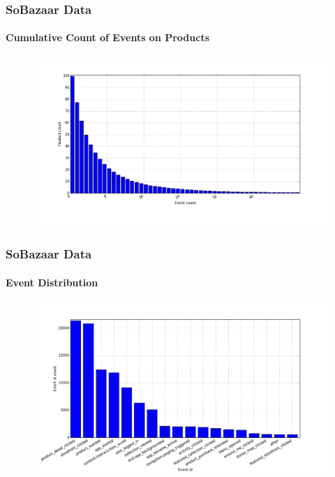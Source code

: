\documentclass{beamer}
\begin{document}
  \begin{frame}
    \frametitle{SoBazaar Data}
    \framesubtitle{Cumulative Count of Events on Products}
    \begin{figure}[H]
        \includegraphics[scale=0.3]{../src/image/product_idcumdistribution.png}
        \centering
    \end{figure}
  \end{frame}

  \begin{frame}
    \frametitle{SoBazaar Data}
    \framesubtitle{Event Distribution}
    \begin{figure}[H]
        \includegraphics[scale=0.3]{../src/image/event_iddistribution.png}
        \centering
    \end{figure}
  \end{frame}
\end{document}
